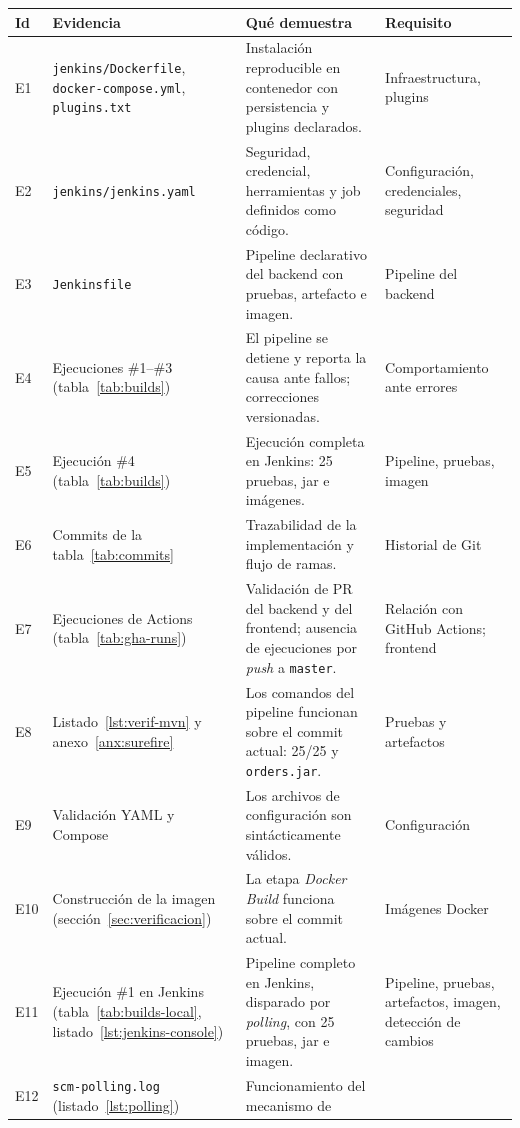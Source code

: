 \documentclass[11pt,a4paper]{article}
\begin{document}
\begin{table}[H]
\centering
\small
\begin{tabularx}{\textwidth}{@{}l P{4.1cm} L P{3.2cm}@{}}
\toprule
\textbf{Id} & \textbf{Evidencia} & \textbf{Qué demuestra} & \textbf{Requisito}\\
\midrule
E1 & \texttt{jenkins/Dockerfile}, \texttt{docker-compose.yml}, \texttt{plugins.txt} & Instalación
reproducible en contenedor con persistencia y plugins declarados. & Infraestructura, plugins\\
E2 & \texttt{jenkins/jenkins.yaml} & Seguridad, credencial, herramientas y job definidos como código. &
Configuración, credenciales, seguridad\\
E3 & \texttt{Jenkinsfile} & Pipeline declarativo del backend con pruebas, artefacto e imagen. &
Pipeline del backend\\
E4 & Ejecuciones \#1--\#3 (tabla~\ref{tab:builds}) & El pipeline se detiene y reporta la causa ante
fallos; correcciones versionadas. & Comportamiento ante errores\\
E5 & Ejecución \#4 (tabla~\ref{tab:builds}) & Ejecución completa en Jenkins: 25 pruebas, jar e
imágenes. & Pipeline, pruebas, imagen\\
E6 & Commits de la tabla~\ref{tab:commits} & Trazabilidad de la implementación y flujo de ramas. &
Historial de Git\\
E7 & Ejecuciones de Actions (tabla~\ref{tab:gha-runs}) & Validación de PR del backend y del frontend;
ausencia de ejecuciones por \emph{push} a \texttt{master}. & Relación con GitHub Actions; frontend\\
E8 & Listado~\ref{lst:verif-mvn} y anexo~\ref{anx:surefire} & Los comandos del pipeline funcionan
sobre el commit actual: 25/25 y \texttt{orders.jar}. & Pruebas y artefactos\\
E9 & Validación YAML y Compose & Los archivos de configuración son sintácticamente válidos. &
Configuración\\
E10 & Construcción de la imagen (sección~\ref{sec:verificacion}) & La etapa \emph{Docker Build}
funciona sobre el commit actual. & Imágenes Docker\\
E11 & Ejecución \#1 en Jenkins (tabla~\ref{tab:builds-local}, listado~\ref{lst:jenkins-console}) &
Pipeline completo en Jenkins, disparado por \emph{polling}, con 25 pruebas, jar e imagen. &
Pipeline, pruebas, artefactos, imagen, detección de cambios\\
E12 & \texttt{scm-polling.log} (listado~\ref{lst:polling}) & Funcionamiento del mecanismo de

\end{tabularx}
\end{table}
\end{document}
